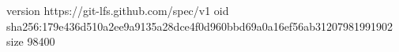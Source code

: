 version https://git-lfs.github.com/spec/v1
oid sha256:179e436d510a2ee9a9135a28dce4f0d960bbd69a0a16ef56ab31207981991902
size 98400

